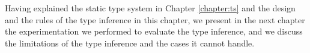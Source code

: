 Having explained the static type system in Chapter \ref{chapter:ts} and the design and the rules of the type inference in this chapter, we present in the next chapter the experimentation we performed to evaluate the type inference, and we discuss the limitations of the type inference and the cases it cannot handle.